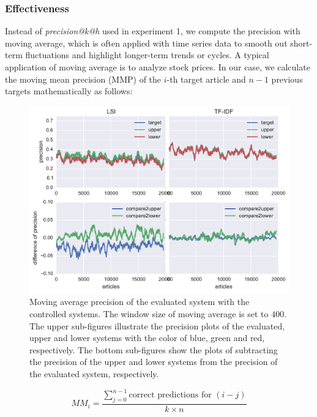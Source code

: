 \subsubsection{Effectiveness}

Instead of \textit{precision@k@h} used in experiment 1, we compute the precision with moving average, which is often applied with time series data to smooth out short-term fluctuations and highlight longer-term trends or cycles. A typical application of moving average is to analyze stock prices. In our case, we calculate the moving mean precision (MMP) of the $i$-th target article and $n-1$ previous targets mathematically as follows:

\begin{figure}[!htb]
    \centering
    \includegraphics[width=\textwidth]{fig/precision_inc}
    \caption[Moving average precision of the evaluated system with the controlled systems]{Moving average precision of the evaluated system with the controlled systems. The window size of moving average is set to $400$. The upper sub-figures illustrate the precision plots of the evaluated, upper and lower systems with the color of blue, green and red, respectively. The bottom sub-figures show the plots of subtracting the precision of the upper and lower systems from the precision of the evaluated system, respectively.}
    \label{fig:predict_inc}
\end{figure}

\begin{equation}
    MM_{i} = \frac{\sum^{n-1}_{j=0} \text{correct predictions for }(i-j)}{k\times n}
\end{equation}


